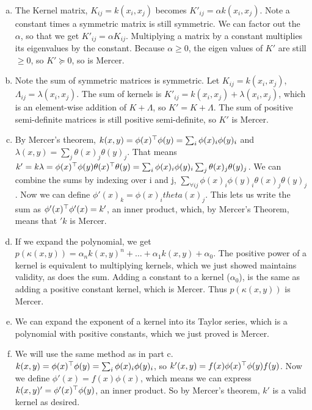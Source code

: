 \documentclass[12pt,letterpaper,fleqn]{hmcpset}
\begin{document}
\begin{enumerate}[(a)]
    \item 
        The Kernel matrix, $K_{ij} = k(x_i, x_j)$ becomes $K'_{ij} = \alpha k(x_i, x_j)$. Note a constant times a symmetric matrix is still symmetric. We can factor out the $\alpha$, so that we get $K'_{ij} = \alpha K_{ij}$. Multiplying a matrix by a constant multiplies its eigenvalues by the constant. Because $\alpha \geq 0$, the eigen values of $K'$ are still $\geq 0$, so $K' \succeq 0$, so is Mercer. 

    \item
        Note the sum of symmetric matrices is symmetric. Let $K_{ij} = k(x_i, x_j)$, $\Lambda_{ij} = \lambda(x_i, x_j)$. The sum of kernels is $K'_{ij} = k(x_i, x_j) + \lambda(x_i, x_j)$, which is an element-wise addition of $K + \Lambda$, so $K' = K + \Lambda$. The sum of positive semi-definite matrices is still positive semi-definite, so $K'$ is Mercer.

    \item
        By Mercer's theorem, $k(x, y) = \phi(x)^\top\phi(y) = \sum_i \phi(x)_i\phi(y)_i$ and $\lambda(x,y) = \sum_j \theta(x)_j\theta(y)_j$. That means $k' = k \lambda = \phi(x)^\top\phi(y) \theta(x)^\top\theta(y) = \sum_i \phi(x)_i\phi(y)_i \sum_j \theta(x)_j\theta(y)_j$. We can combine the sums by indexing over i and j, $\sum_{\forall{ij}} \phi(x)_i\phi(y)_i \theta(x)_j\theta(y)_j$. Now we can define $\phi'(x)_k = \phi(x)_i theta(x)_j$. This lets us write the sum as $\phi'(x)^\top \phi'(x) = k'$, an inner product, which, by Mercer's Theorem, means that $'k$ is Mercer.

    \item
        If we expand the polynomial, we get $p(\kappa(x,y)) = \alpha_n k(x,y)^n +\hdots+ \alpha_{1}k(x,y) + \alpha_0$. The positive power of a kernel is equivalent to multiplying kernels, which we just showed maintains validity, as does the sum. Adding a constant to a kernel ($\alpha_0$), is the same as adding a positive constant kernel, which is Mercer. Thus $p(\kappa(x,y))$ is Mercer.

    \item
        We can expand the exponent of a kernel into its Taylor series, which is a polynomial with positive constants, which we just proved is Mercer.

    \item
        We will use the same method as in part c. $k(x, y) = \phi(x)^\top\phi(y) = \sum_i \phi(x)_i\phi(y)_i$, so $k'(x,y) = f(x)\phi(x)^\top\phi(y)f(y)$. Now we define $\phi'(x) = f(x) \phi(x)$, which means we can express $k(x,y)' = \phi'(x)^\top \phi(y)$, an inner product. So by Mercer's theorem, $k'$ is a valid kernel as desired.

\end{enumerate}
\end{document}
